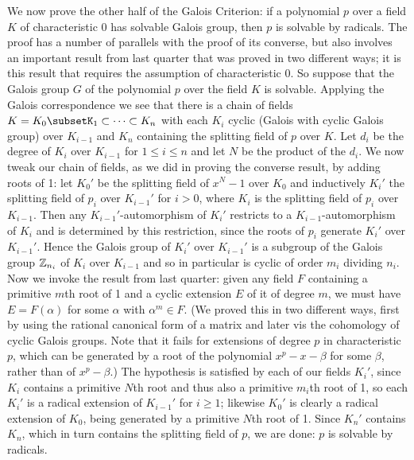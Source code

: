 We now prove the other half of the Galois Criterion:  if a polynomial $p$ over a field $K$ of characteristic 0 has solvable Galois group, then $p$ is solvable by radicals.  The proof has a number of parallels with the proof of its converse, but also involves an important result from last quarter that was proved in two different ways; it is this result that requires the assumption of characteristic 0.  So suppose that the Galois group $G$ of the polynomial $p$ over the field $K$ is solvable.  Applying the Galois correspondence we see that there is a chain of fields
$K=K_0\subsetK_1\subset\cdots\subset K_n$ with each $K_i$ cyclic (Galois with cyclic Galois group) over $K_{i-1}$ and $K_n$ containing the splitting field of $p$ over $K$.  Let $d_i$ be the degree of
$K_i$ over $K_{i-1}$ for $1\le i\le n$ and let $N$ be the product of the $d_i$.  We now tweak our chain of fields, as we did in proving the converse result, by adding roots of 1:  let $K_0'$ be the splitting field of $x^N - 1$ over $K_0$ and inductively $K_i'$ the splitting field of $p_i$ over $K_{i-1}'$ for $i>0$, where $K_i$ is the splitting field of $p_i$ over $K_{i-1}$.  Then any $K_{i-1}'$-automorphism of $K_i'$ restricts to a $K_{i-1}$-automorphism of $K_i$ and is determined by this restriction, since the roots of $p_i$ generate $K_i'$ over $K_{i-1}'$.  Hence the Galois group of $K_i'$ over $K_{i-1}'$ is a subgroup of the Galois group $\Bbb Z_{n_i}$ of $K_i$ over $K_{i-1}$ and so in particular is cyclic of order $m_i$ dividing $n_i$.  Now we invoke the result from last quarter:  given any field $F$ containing a primitive $m$th root of 1 and a cyclic extension $E$ of it of degree $m$, we must have $E=F(\alpha)$ for some $\alpha$ with $\alpha^m\in F$.  (We proved this in two different ways, first by using the rational canonical form of a matrix and later vis the cohomology of cyclic Galois groups.  Note that it fails for extensions of degree $p$ in characteristic $p$, which can be generated by a root of the polynomial $x^p - x - \beta$ for some $\beta$, rather than of $x^p - \beta$.)  The hypothesis is satisfied by each of our fields $K_i'$, since $K_i$ contains a primitive $N$th root and thus also a primitive $m_i$th root of 1, so each $K_i'$ is a radical extension of $K_{i-1}'$ for $i\ge1$; likewise $K_0'$ is clearly a radical extension of $K_0$, being generated by a primitive $N$th root of 1.  Since $K_n'$ contains $K_n$, which in turn contains the splitting field of $p$, we are done:  $p$ is solvable by radicals.

